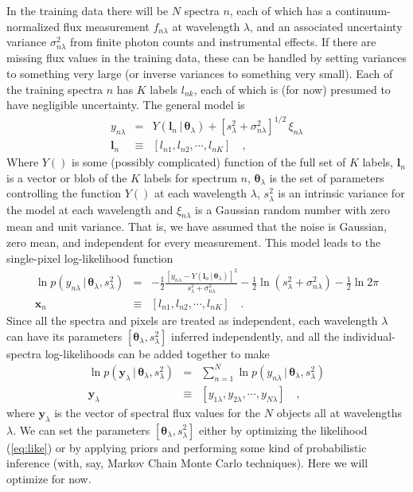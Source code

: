 \documentclass[12pt, preprint]{aastex}
\newcommand{\set}[1]{\bm{#1}}
\newcommand{\given}{\,|\,}
\begin{document}
In the training data there will be $N$ spectra $n$, each of which has
a continuum-normalized flux measurement $f_{n\lambda}$ at wavelength
$\lambda$, and an associated uncertainty variance
$\sigma_{n\lambda}^2$ from finite photon counts and instrumental effects.
If there are missing flux values in the training data, these can be
handled by setting variances to something very large (or inverse
variances to something very small).
Each of the training spectra $n$ has $K$ labels $l_{nk}$, each of which
is (for now) presumed to have negligible uncertainty.
The general model is
\begin{eqnarray}
y_{n\lambda} &=&
Y(\set{l}_n\given\set{\theta}_\lambda) + [s_\lambda^2 + \sigma_{n\lambda}^2]^{1/2}\,\xi_{n\lambda}
\label{eq:model}\\
\set{l}_n &\equiv& [l_{n1}, l_{n2}, \cdots, l_{nK}]
\quad,
\end{eqnarray}
Where $Y()$ is some (possibly complicated) function of the full set
of $K$ labels, $\set{l}_n$ is a vector or blob of the $K$ labels for spectrum $n$,
$\set{\theta}_\lambda$ is the set of parameters controlling the
function $Y()$ at each wavelength $\lambda$, $s_\lambda^2$ is an
intrinsic variance for the model at each wavelength and
$\xi_{n\lambda}$ is a Gaussian random number with zero mean and unit
variance.
That is, we have assumed that the noise is Gaussian, zero mean, and
independent for every measurement.
This model leads to the single-pixel log-likelihood function
\begin{eqnarray}
\ln p(y_{n\lambda}\given\set{\theta}_\lambda,s_\lambda^2) &=&
 -\frac{1}{2}\frac{[y_{n\lambda} - Y(\set{l}_n\given\set{\theta}_\lambda)]^2}{s_\lambda^2 + \sigma_{n\lambda}^2}
 -\frac{1}{2}\ln(s_\lambda^2 + \sigma_{n\lambda}^2)
 -\frac{1}{2}\ln 2\pi
\label{eq:like1}\\
\set{x}_n &\equiv& [l_{n1}, l_{n2}, \cdots, l_{nK}]
\quad.
\end{eqnarray}
Since all the spectra and pixels are treated as independent, each
wavelength $\lambda$ can have its parameters
$[\set{\theta}_\lambda,s_\lambda^2]$ inferred independently, and all the
individual-spectra log-likelihoods can be added together to make
\begin{eqnarray}
\ln p(\set{y}_\lambda\given\set{\theta}_\lambda,s_\lambda^2) &=&
 \sum_{n=1}^N \ln p(y_{n\lambda}\given\set{\theta}_\lambda,s_\lambda^2)
\label{eq:like}\\
\set{y}_\lambda &\equiv& [y_{1\lambda}, y_{2\lambda}, \cdots, y_{N\lambda}]
\quad,
\end{eqnarray}
where $\set{y}_\lambda$ is the vector of spectral flux values for
the $N$ objects all at wavelengths $\lambda$.
We can set the parameters $[\set{\theta}_\lambda,s_\lambda^2]$ either by
optimizing the likelihood (\ref{eq:like}) or by applying priors and
performing some kind of probabilistic inference (with, say, Markov
Chain Monte Carlo techniques).
Here we will optimize for now.
\end{document}
